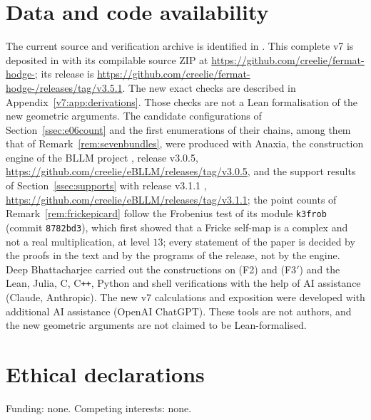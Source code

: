 \documentclass[11pt,reqno]{amsart}
\numberwithin{equation}{section}
\theoremstyle{plain}
\theoremstyle{definition}
\newcommand{\Fii}{\texorpdfstring{\textup{(F2)}}{(F2)}}
\newcommand{\Fiii}{\texorpdfstring{\textup{(F3$'$)}}{(F3')}}
\newcommand{\codeRelease}{https://github.com/creelie/fermat-hodge-/releases/tag/v3.5.1}
\begin{document}
\section*{Data and code availability}
The current source and verification archive is identified in \cite{BB26code}. This complete v7 is deposited in  with its compilable source ZIP  at \url{https://github.com/creelie/fermat-hodge-}; its release is \url{\codeRelease}. The new exact checks are described in Appendix~\ref{v7:app:derivations}. Those checks are not a Lean formalisation of the new geometric arguments. The candidate configurations of Section~\ref{ssec:e06count} and the first enumerations of their chains, among them that of Remark~\ref{rem:sevenbundles}, were produced with Anaxia, the construction engine of the BLLM project \cite{Bha26bllm}, release v3.0.5, \url{https://github.com/creelie/eBLLM/releases/tag/v3.0.5}, and the support results of Section~\ref{ssec:supports} with release v3.1.1 \cite{Bha26bllmb}, \url{https://github.com/creelie/eBLLM/releases/tag/v3.1.1}; the point counts of Remark~\ref{rem:frickepicard} follow the Frobenius test of its module \texttt{k3frob} (commit \texttt{8782bd3}), which first showed that a Fricke self-map is a complex and not a real multiplication, at level $13$; every statement of the paper is decided by the proofs in the text and by the programs of the release, not by the engine. Deep Bhattacharjee carried out the constructions on \Fii{} and \Fiii{} and the Lean, Julia, C, C\texttt{++}, Python and shell verifications with the help of AI assistance (Claude, Anthropic). The new v7 calculations and exposition were developed with additional AI assistance (OpenAI ChatGPT). These tools are not authors, and the new geometric arguments are not claimed to be Lean-formalised.

\section*{Ethical declarations}
Funding: none. Competing interests: none.
\end{document}

